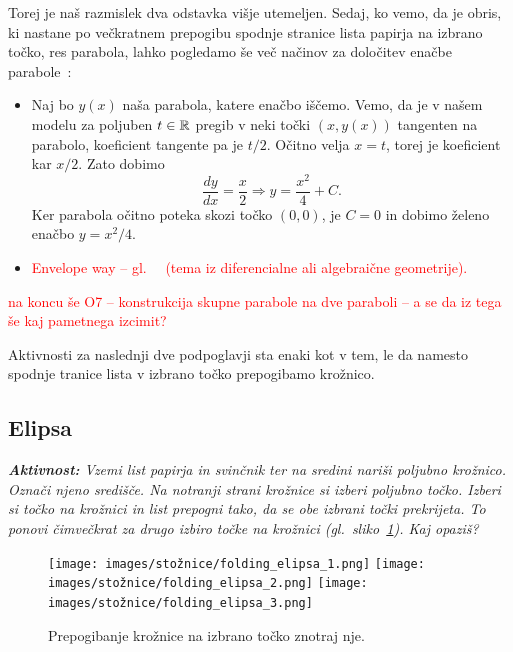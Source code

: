 Torej je naš razmislek dva odstavka višje utemeljen. Sedaj, ko vemo, da je obris, ki nastane po večkratnem prepogibu spodnje stranice lista papirja na izbrano točko, res parabola, lahko pogledamo še več načinov za določitev enačbe parabole~\cite[str.\ 55--56]{hull2013}:
\begin{itemize}
    \item Naj bo $y(x)$ naša parabola, katere enačbo iščemo. Vemo, da je v našem modelu za poljuben $t \in \mathbb R$ pregib v neki točki $(x, y(x))$ tangenten na parabolo, koeficient tangente pa je $t / 2$. Očitno velja $x = t$, torej je koeficient kar $x / 2$. Zato dobimo
    $$ \frac{dy}{dx} = \frac{x}{2} \Rightarrow y = \frac{x^2}{4} + C. $$
    Ker parabola očitno poteka skozi točko $(0, 0)$, je $C = 0$ in dobimo želeno enačbo $y = x^2 / 4$.
    \item \textcolor{red}{Envelope way -- gl.\ ~\cite[str.\ 56 spodaj]{hull2013} (tema iz diferencialne ali algebraične geometrije).}
\end{itemize}

\textcolor{red}{na koncu še O7 -- konstrukcija skupne parabole na dve paraboli -- a se da iz tega še kaj pametnega izcimit?}

Aktivnosti za naslednji dve podpoglavji sta enaki kot v tem, le da namesto spodnje tranice lista v izbrano točko prepogibamo krožnico.

\subsection{Elipsa}

\textit{\textbf{Aktivnost:} Vzemi list papirja in svinčnik ter na sredini nariši poljubno krožnico. Označi njeno središče. Na notranji strani krožnice si izberi poljubno točko. Izberi si točko na krožnici in list prepogni tako, da se obe izbrani točki prekrijeta. To ponovi čimvečkrat za drugo izbiro točke na krožnici (gl.\ sliko~\ref{fig:koraki_elipsa}). Kaj opaziš?}

\begin{figure}[h]
    \centering
    \texttt{[image: images/stožnice/folding\_elipsa\_1.png]}
    \texttt{[image: images/stožnice/folding\_elipsa\_2.png]}
    \texttt{[image: images/stožnice/folding\_elipsa\_3.png]}
    \caption[Prepogibanje elipse]{Prepogibanje krožnice na izbrano točko znotraj nje.}
    \label{fig:koraki_elipsa}
\end{figure}


